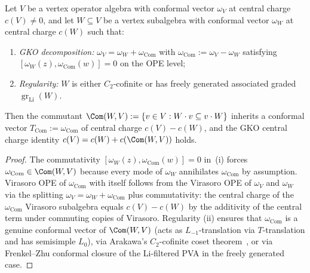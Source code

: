 \begin{theorem}
\label{thm:coset-conformal-inheritance}
%
%
%
%
Let $V$ be a vertex operator algebra with conformal vector
$\omega_V$ at central charge $c(V) \neq 0$, and let
$W \subseteq V$ be a vertex subalgebra with conformal vector
$\omega_W$ at central charge $c(W)$ such that:
\begin{enumerate}[label=\textup{(\roman*)}]
\item \emph{GKO decomposition:}
 $\omega_V = \omega_W + \omega_{\mathrm{Com}}$ with
 $\omega_{\mathrm{Com}} := \omega_V - \omega_W$ satisfying
 $[\omega_W(z), \omega_{\mathrm{Com}}(w)] = 0$
 on the OPE level;
\item \emph{Regularity:} $W$ is either $C_2$-cofinite or has
 freely generated associated graded
 $\operatorname{gr}_{\mathrm{Li}}(W)$.
\end{enumerate}
Then the commutant $\Com(W, V) := \{v \in V : W \cdot v \subseteq v \cdot W\}$
inherits a conformal vector $T_{\mathrm{Com}} := \omega_{\mathrm{Com}}$
of central charge $c(V) - c(W)$, and the GKO central charge
identity $c(V) = c(W) + c(\Com(W,V))$ holds.
\end{theorem}

\begin{proof}
The commutativity
$[\omega_W(z), \omega_{\mathrm{Com}}(w)] = 0$ in~(i) forces
$\omega_{\mathrm{Com}} \in \Com(W, V)$ because every mode of
$\omega_W$ annihilates $\omega_{\mathrm{Com}}$ by assumption.
Virasoro OPE of $\omega_{\mathrm{Com}}$ with itself follows
from the Virasoro OPE of $\omega_V$ and $\omega_W$ via the
splitting
$\omega_V = \omega_W + \omega_{\mathrm{Com}}$ plus
commutativity: the central charge of the $\omega_{\mathrm{Com}}$
Virasoro subalgebra equals $c(V) - c(W)$ by the additivity of
the central term under commuting copies of Virasoro. Regularity
(ii) ensures that $\omega_{\mathrm{Com}}$ is a genuine conformal
vector of $\Com(W, V)$ (acts as $L_{-1}$-translation via
$T$-translation and has semisimple $L_0$), via Arakawa's
$C_2$-cofinite coset theorem~\cite{AraCoset}, or via
Frenkel--Zhu conformal closure of the Li-filtered PVA in the
freely generated case.
\end{proof}

